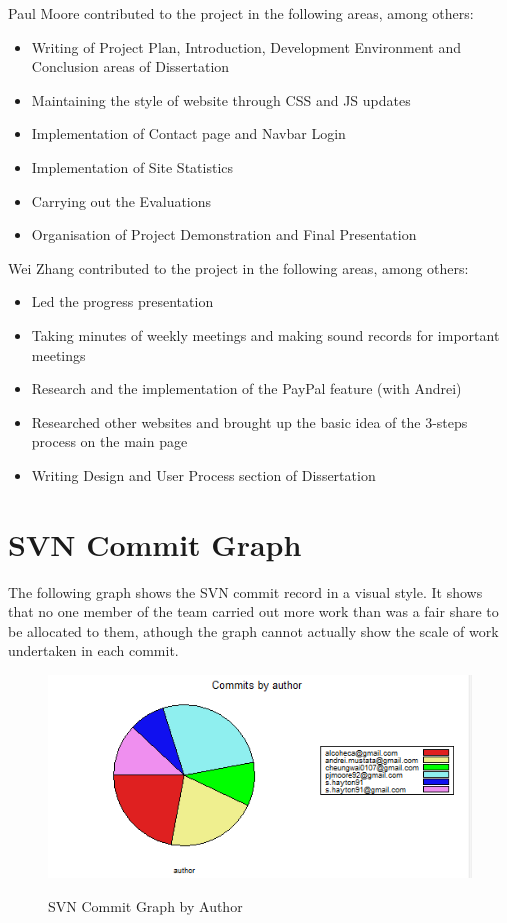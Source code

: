 \documentclass{l3proj}
\begin{document}
Paul Moore contributed to the project in the following areas, among others:
\begin{itemize}
\item{Writing of Project Plan, Introduction, Development Environment and Conclusion areas of Dissertation}
\item{Maintaining the style of website through CSS and JS updates}
\item{Implementation of Contact page and Navbar Login}
\item{Implementation of Site Statistics}
\item{Carrying out the Evaluations}
\item{Organisation of Project Demonstration and Final Presentation}
\end{itemize}
Wei Zhang contributed to the project in the following areas, among others:
\begin{itemize}
\item{Led the progress presentation}
\item{Taking minutes of weekly meetings and making sound records for important meetings}
\item{Research and the implementation of the PayPal feature (with Andrei)}
\item{Researched other websites and brought up the basic idea of the 3-steps process on the main page}
\item{Writing Design and User Process section of Dissertation}
\end{itemize}	

\section{SVN Commit Graph}
The following graph shows the SVN commit record in a visual style. It shows that no one member of the team carried out more work than was a fair share to be allocated to them, athough the graph cannot actually show the scale of work undertaken in each commit.

\begin{figure}
\begin{center}
\label{fig:gantttasks}
\includegraphics{figures/commit}
\caption{\small{SVN Commit Graph by Author}}
\end{center}
\end{figure}
\end{document}
